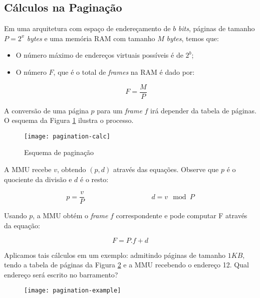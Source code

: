 \subsection{Cálculos na Paginação}
Em uma arquitetura com espaço de endereçamento de $b$ \textit{bits}, páginas de tamanho $P = 2^{x}$ \textit{bytes} e uma memória RAM com tamanho $M$ \textit{bytes}, temos que:

\begin{itemize}
  \item O número máximo de endereços virtuais possíveis é de $2^b$;

  \item O número $F$, que é o total de \textit{frames} na RAM é dado por:

  \begin{equation*}
    F = \frac{M}{P}
  \end{equation*}
\end{itemize}

A conversão de uma página $p$ para um \textit{frame} $f$ irá depender da tabela de páginas. O esquema da Figura \ref{fig:pagination-calc} ilustra o processo.

\begin{figure}[H]
  \centering
  \texttt{[image: pagination-calc]}
  \caption{Esquema de paginação}
  \label{fig:pagination-calc}
\end{figure}

A MMU recebe $v$, obtendo $(p,d)$ através das equações. Observe que $p$ é o quociente da divisão e $d$ é o resto:

\begin{equation*}
  p = \frac{v}{P} \hspace{4cm} d = v\mod P
\end{equation*}

Usando $p$, a MMU obtém o \textit{frame} $f$ correspondente e pode computar F através da equação:

\begin{equation*}
  F = P . f + d
\end{equation*}

Aplicamos tais cálculos em um exemplo: admitindo páginas de tamanho $1KB$, tendo a tabela de páginas da Figura \ref{fig:pagination-example} e a MMU recebendo o endereço 12. Qual endereço será escrito no barramento?

\begin{figure}[H]
  \centering
  \texttt{[image: pagination-example]}
  \caption{}
  \label{fig:pagination-example}
\end{figure}

